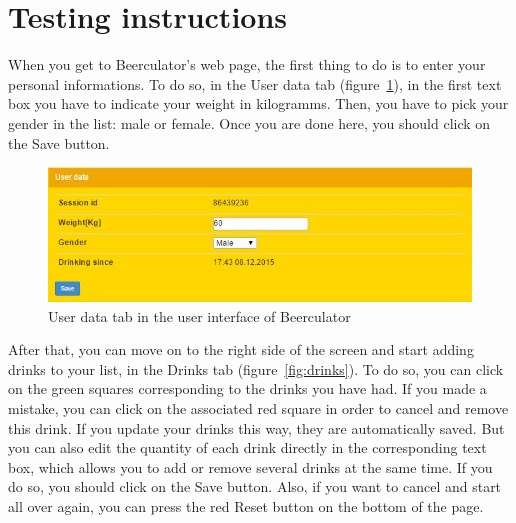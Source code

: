 \section{Testing instructions}
\label{sec:test}

When you get to Beerculator's web page, the first thing to do is to enter your personal informations. To do so, in the \guillemotleft{} User data \guillemotright{} tab ({\sc figure}~\ref{fig:userData}), in the first text box you have to indicate your weight in kilogramms. Then, you have to pick your gender in the list: male or female. Once you are done here, you should click on the \guillemotleft{} Save \guillemotright{} button.\\

\begin{figure}[H]
	\centering
   \includegraphics[scale=0.65]{./figures/userData.jpg}
   \caption{User data tab in the user interface of Beerculator}
   \label{fig:userData}
\end{figure}

After that, you can move on to the right side of the screen and start adding drinks to your list, in the \guillemotleft{} Drinks \guillemotright{} tab ({\sc figure}~\ref{fig:drinks}). To do so, you can click on the green squares corresponding to the drinks you have had. If you made a mistake, you can click on the associated red square in order to cancel and remove this drink. If you update your drinks this way, they are automatically saved. But you can also edit the quantity of each drink directly in the corresponding text box, which allows you to add or remove several drinks at the same time. If you do so, you should click on the \guillemotleft{} Save \guillemotright{} button. Also, if you want to cancel and start all over again, you can press the red \guillemotleft{} Reset \guillemotright{} button on the bottom of the page.\\

